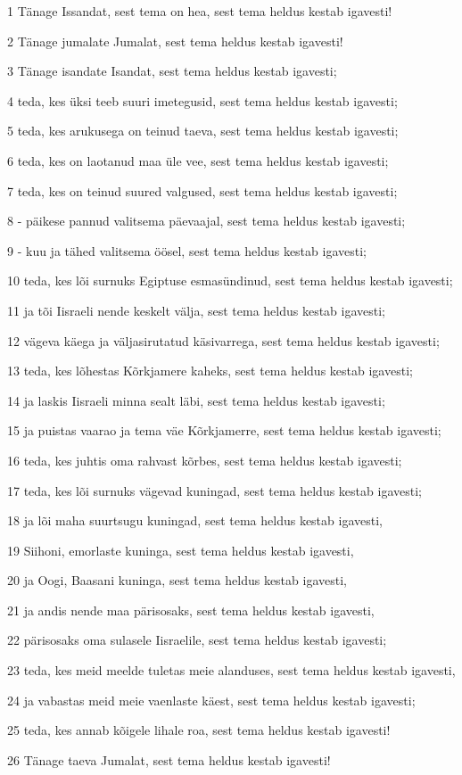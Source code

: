 \par 1 Tänage Issandat, sest tema on hea, sest tema heldus kestab igavesti!
\par 2 Tänage jumalate Jumalat, sest tema heldus kestab igavesti!
\par 3 Tänage isandate Isandat, sest tema heldus kestab igavesti;
\par 4 teda, kes üksi teeb suuri imetegusid, sest tema heldus kestab igavesti;
\par 5 teda, kes arukusega on teinud taeva, sest tema heldus kestab igavesti;
\par 6 teda, kes on laotanud maa üle vee, sest tema heldus kestab igavesti;
\par 7 teda, kes on teinud suured valgused, sest tema heldus kestab igavesti;
\par 8 - päikese pannud valitsema päevaajal, sest tema heldus kestab igavesti;
\par 9 - kuu ja tähed valitsema öösel, sest tema heldus kestab igavesti;
\par 10 teda, kes lõi surnuks Egiptuse esmasündinud, sest tema heldus kestab igavesti;
\par 11 ja tõi Iisraeli nende keskelt välja, sest tema heldus kestab igavesti;
\par 12 vägeva käega ja väljasirutatud käsivarrega, sest tema heldus kestab igavesti;
\par 13 teda, kes lõhestas Kõrkjamere kaheks, sest tema heldus kestab igavesti;
\par 14 ja laskis Iisraeli minna sealt läbi, sest tema heldus kestab igavesti;
\par 15 ja puistas vaarao ja tema väe Kõrkjamerre, sest tema heldus kestab igavesti;
\par 16 teda, kes juhtis oma rahvast kõrbes, sest tema heldus kestab igavesti;
\par 17 teda, kes lõi surnuks vägevad kuningad, sest tema heldus kestab igavesti;
\par 18 ja lõi maha suurtsugu kuningad, sest tema heldus kestab igavesti,
\par 19 Siihoni, emorlaste kuninga, sest tema heldus kestab igavesti,
\par 20 ja Oogi, Baasani kuninga, sest tema heldus kestab igavesti,
\par 21 ja andis nende maa pärisosaks, sest tema heldus kestab igavesti,
\par 22 pärisosaks oma sulasele Iisraelile, sest tema heldus kestab igavesti;
\par 23 teda, kes meid meelde tuletas meie alanduses, sest tema heldus kestab igavesti,
\par 24 ja vabastas meid meie vaenlaste käest, sest tema heldus kestab igavesti;
\par 25 teda, kes annab kõigele lihale roa, sest tema heldus kestab igavesti!
\par 26 Tänage taeva Jumalat, sest tema heldus kestab igavesti!

